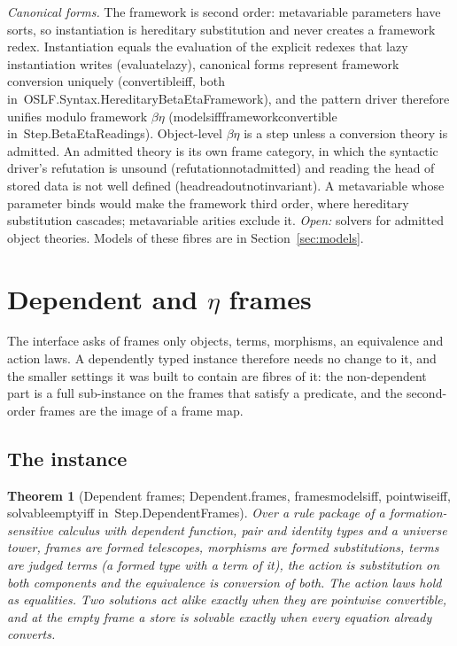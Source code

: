 \documentclass[11pt]{article}
\newtheorem{theorem}{Theorem}
\theoremstyle{remark}
\newcommand{\lean}[1]{{\ttfamily\def\_{\textunderscore\allowbreak}#1}}
\newcommand{\inmod}[1]{in~{\ttfamily\def\_{\textunderscore\allowbreak}#1}}
\begin{document}
\emph{Canonical forms.} The framework is second order: metavariable parameters have sorts, so
instantiation is hereditary substitution and never creates a framework redex. Instantiation equals the
evaluation of the explicit redexes that lazy instantiation writes (\lean{evaluate\_lazy}), canonical forms
represent framework conversion uniquely (\lean{convertible\_iff}, both \inmod{OSLF.Syntax.HereditaryBetaEtaFramework}),
and the pattern driver therefore unifies modulo framework $\beta\eta$
(\lean{models\_iff\_framework\_convertible} \inmod{Step.BetaEtaReadings}). Object-level $\beta\eta$ is a step
unless a conversion theory is admitted. An admitted theory is its own frame category, in which the
syntactic driver's refutation is unsound (\lean{refutation\_not\_admitted}) and reading the head of stored
data is not well defined (\lean{head\_readout\_not\_invariant}). A metavariable whose parameter binds would
make the framework third order, where hereditary substitution cascades; metavariable arities exclude
it. \emph{Open:} solvers for admitted object theories. Models of these fibres are in
Section~\ref{sec:models}.

\section{Dependent and \texorpdfstring{$\eta$}{eta} frames}\label{sec:dependent}

The interface asks of frames only objects, terms, morphisms, an equivalence and action laws. A
dependently typed instance therefore needs no change to it, and the smaller settings it was built to
contain are fibres of it: the non-dependent part is a full sub-instance on the frames that satisfy a
predicate, and the second-order frames are the image of a frame map.

\subsection{The instance}

\begin{theorem}[Dependent frames; \lean{Dependent.frames}, \lean{frames\_models\_iff}, \lean{pointwise\_iff}, \lean{solvable\_empty\_iff} \inmod{Step.DependentFrames}]
Over a rule package of a formation-sensitive calculus with dependent function, pair and identity
types and a universe tower, frames are formed telescopes, morphisms are formed substitutions, terms are
judged terms (a formed type with a term of it), the action is substitution on both components and the
equivalence is conversion of both. The action laws hold as equalities. Two solutions act alike exactly
when they are pointwise convertible, and at the empty frame a store is solvable exactly when every
equation already converts.
\end{theorem}
\end{document}
